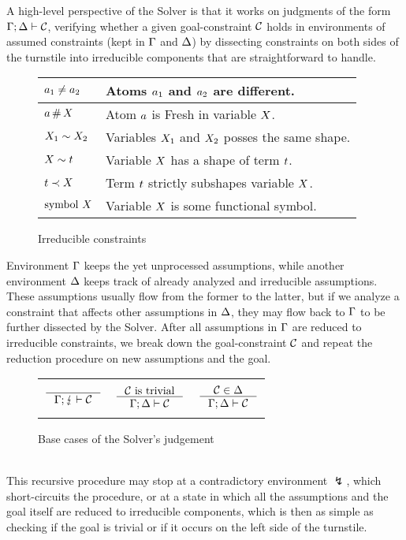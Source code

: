 \documentclass[english, mgr]{iithesis}
\newcommand{\solverRule}{\vdash}
\begin{document}
A high-level perspective of the Solver is that it works on judgments of the form
$\cEnv; \icEnv \solverRule \sconstr$, verifying whether a given goal-constraint $\mathcal{C}$
holds in environments of assumed constraints (kept in $\Gamma$ and $\Delta$)
by dissecting constraints on both sides of the turnstile into
irreducible components that are straightforward to handle.
\begin{figure}
  \centering
  \begin{tabularx}{\textwidth}{|l|X|}
    \hline
    $a_1 \neq a_2$
    & Atoms $a_1$ and $a_2$ are different.
    \\ \hline
    $a   \,\#\, X$
    & Atom $a$ is {Fresh} in variable $X$.
    \\ \hline
    $X_1 \sim  X_2$
    & Variables $X_1$ and $X_2$ posses the same shape.
    \\ \hline
    $X   \sim  t$
    & Variable $X$ has a shape of term $t$.
    \\ \hline
    $t    \prec  X$
    & Term $t$ strictly subshapes variable $X$.
    \\ \hline
    $\text{symbol } X$
    & Variable $X$ is some functional symbol.
    \\ \hline
  \end{tabularx}
  \caption{Irreducible constraints}
  \label{fig:irreducible-constraints}
\end{figure}

Environment $\Gamma$ keeps the yet unprocessed assumptions,
while another environment $\Delta$ keeps track of already analyzed and irreducible assumptions.
These assumptions usually flow from the former to the latter, but if we analyze
a constraint that affects other assumptions in $\Delta$,
they may flow back to $\Gamma$ to be further dissected by the Solver.
After all assumptions in $\Gamma$ are reduced to irreducible constraints,
we break down the goal-constraint $\mathcal{C}$ and repeat the reduction procedure on
new assumptions and the goal.
\begin{figure}[htpb]
  \centering
    \begin{tabularx}{\textwidth}{|CCC|}
    \hline & & \\ $
      \inference{
      }{
        \cEnv ; \lightning \solverRule \sconstr
      }
      $ & $
      \inference{
        \sconstr \text{ is trivial}
      }{
        \cEnv ; \icEnv \solverRule \sconstr
      } $ & $
      \inference{
        \sconstr \in \icEnv
      }{
        \cEnv ; \icEnv \solverRule \sconstr
      } $ \\ & & \\ \hline
    \end{tabularx}
  \caption{Base cases of the Solver's judgement}
  \label{fig:solver-base}
\end{figure}
\\
This recursive procedure may stop at a contradictory environment $\lightning$,
which short-circuits the procedure, or at
a state in which all the assumptions and the goal itself are reduced to irreducible components,
which is then as simple as checking if the goal is trivial or if it
occurs on the left side of the turnstile.
\end{document}
